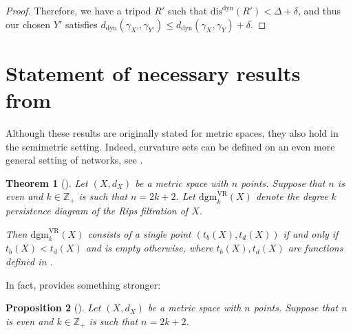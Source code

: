 \documentclass[a4paper,UKenglish,thm-restate]{article}
\newtheorem{theorem}{Theorem}[section]
\newtheorem{proposition}[theorem]{Proposition}
\theoremstyle{definition}
\begin{document}
\begin{appendices}
\begin{proof}
            Therefore, we have a tripod $R'$ such that $\text{dis}^{\text{dyn}}(R') < \Delta + \delta$, and thus our chosen $Y'$ satisfies $d_{\text{dyn}}(\gamma_{X'}, \gamma_{Y'}) \leq d_{\text{dyn}}(\gamma_X, \gamma_Y) + \delta$.
        \end{proof}

    \section{Statement of necessary results from \cite{curvaturesets}} \label{app:curvaturesetstheorem}
        Although these results are originally stated for metric spaces, they also hold in the semimetric setting. Indeed, curvature sets can be defined on an even more general setting of networks, see \cite{chowdhury2023distances}.
        \begin{theorem}[{\cite[Theorem 4.4(B)]{curvaturesets}}]
            Let $(X, d_X)$ be a metric space with $n$ points. Suppose that $n$ is even and $k \in \mathbb{Z}_+$ is such that $n = 2k+2$. Let $\mathrm{dgm}_k^{\mathrm{VR}}(X)$ denote the degree $k$ persistence diagram of the Rips filtration of $X$. 
            
            Then $\mathrm{dgm}_k^{\mathrm{VR}}(X)$ consists of a single point $(t_b(X), t_d(X))$ if and only if $t_b(X) < t_d(X)$ and is empty otherwise, where $t_b(X), t_d(X)$ are functions defined in \cite[Definition 4.1]{curvaturesets}.
        \end{theorem}
        In fact, \cite{curvaturesets} provides something stronger:
        \begin{proposition}[{\cite[Proposition 4.3]{curvaturesets}}]
            Let $(X, d_X)$ be a metric space with $n$ points. Suppose that $n$ is even and $k \in \mathbb{Z}_+$ is such that $n = 2k+2$. 


\end{proposition}
\end{appendices}
\end{document}
